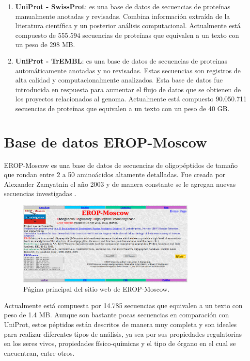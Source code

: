 \begin{enumerate}

\item \textbf{UniProt - SwissProt}: es una base de datos de secuencias de proteínas manualmente anotadas y revisadas. Combina información extraída de la literatura científica y un posterior análisis computacional. Actualmente está compuesto de 555.594 secuencias de proteínas que equivalen a un texto con un peso de 298 MB.

\item \textbf{UniProt - TrEMBL}: es una base de datos de secuencias de proteínas automáticamente anotadas y no revisadas. Estas secuencias son registros de alta calidad y computacionalmente analizados. Esta base de datos fue introducida en respuesta para aumentar el flujo de datos que se obtienen de los proyectos relacionados al genoma. Actualmente está compuesto 90.050.711 secuencias de proteínas que equivalen a un texto con un peso de 40 GB.

\end{enumerate}

\section{Base de datos EROP-Moscow}

EROP-Moscow es una base de datos de secuencias de oligopéptidos de tamaño que rondan entre 2 a 50 aminoácidos altamente detalladas. Fue creada por Alexander Zamyatnin el año 2003 y de manera constante se le agregan nuevas secuencias investigadas \cite{eropmoscow}.

\begin{figure}[h]
    \centering
    \includegraphics[width=0.8\textwidth]{./images/eropmoscow_main.png}
    \caption{Página principal del sitio web de EROP-Moscow.}
    \label{fig:image8}
\end{figure}

Actualmente está compuesta por 14.785 secuencias que equivalen a un texto con peso de 1.4 MB. Aunque son bastante pocas secuencias en comparación con UniProt, estos péptidos están descritos de manera muy completa y son ideales para realizar diferentes tipos de análisis, ya sea por sus propiedades regulatorias en los seres vivos, propiedades físico-químicas y el tipo de órgano en el cual se encuentran, entre otros.

